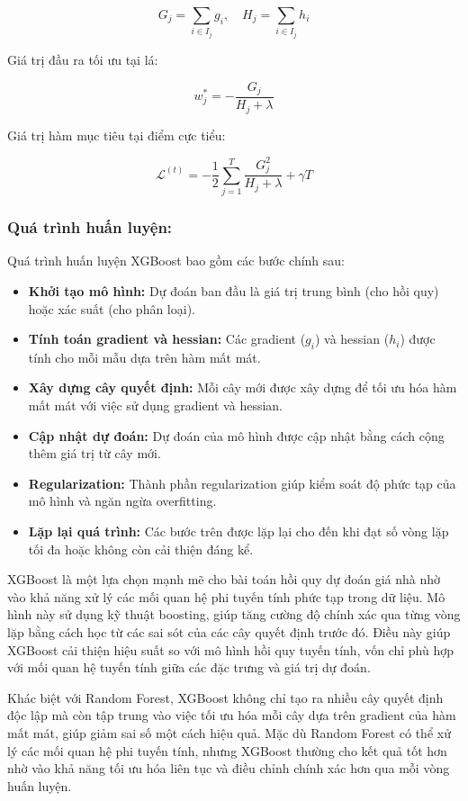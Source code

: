 \[
G_j = \sum_{i \in I_j} g_i, \quad H_j = \sum_{i \in I_j} h_i
\]

Giá trị đầu ra tối ưu tại lá:

\[
w_j^* = -\frac{G_j}{H_j + \lambda}
\]

Giá trị hàm mục tiêu tại điểm cực tiểu:

\[
\mathcal{L}^{(t)} = -\frac{1}{2} \sum_{j=1}^{T} \frac{G_j^2}{H_j + \lambda} + \gamma T
\]

\subsubsection*{Quá trình huấn luyện:}
Quá trình huấn luyện XGBoost bao gồm các bước chính sau:

\begin{itemize}
	\item[1. ] \textbf{Khởi tạo mô hình:} Dự đoán ban đầu là giá trị trung bình (cho hồi quy) hoặc xác suất (cho phân loại).
	\item[2.] \textbf{Tính toán gradient và hessian:} Các gradient (\( g_i \)) và hessian (\( h_i \)) được tính cho mỗi mẫu dựa trên hàm mất mát.
	\item[3.] \textbf{Xây dựng cây quyết định:} Mỗi cây mới được xây dựng để tối ưu hóa hàm mất mát với việc sử dụng gradient và hessian.
	\item[4.] \textbf{Cập nhật dự đoán:} Dự đoán của mô hình được cập nhật bằng cách cộng thêm giá trị từ cây mới.
	\item[5.] \textbf{Regularization:} Thành phần regularization giúp kiểm soát độ phức tạp của mô hình và ngăn ngừa overfitting.
	\item[6.] \textbf{Lặp lại quá trình:} Các bước trên được lặp lại cho đến khi đạt số vòng lặp tối đa hoặc không còn cải thiện đáng kể.
\end{itemize}

XGBoost là một lựa chọn mạnh mẽ cho bài toán hồi quy dự đoán giá nhà nhờ vào khả năng xử lý các mối quan hệ phi tuyến tính phức tạp trong dữ liệu. Mô hình này sử dụng kỹ thuật boosting, giúp tăng cường độ chính xác qua từng vòng lặp bằng cách học từ các sai sót của các cây quyết định trước đó. Điều này giúp XGBoost cải thiện hiệu suất so với mô hình hồi quy tuyến tính, vốn chỉ phù hợp với mối quan hệ tuyến tính giữa các đặc trưng và giá trị dự đoán.

Khác biệt với Random Forest, XGBoost không chỉ tạo ra nhiều cây quyết định độc lập mà còn tập trung vào việc tối ưu hóa mỗi cây dựa trên gradient của hàm mất mát, giúp giảm sai số một cách hiệu quả. Mặc dù Random Forest có thể xử lý các mối quan hệ phi tuyến tính, nhưng XGBoost thường cho kết quả tốt hơn nhờ vào khả năng tối ưu hóa liên tục và điều chỉnh chính xác hơn qua mỗi vòng huấn luyện.

